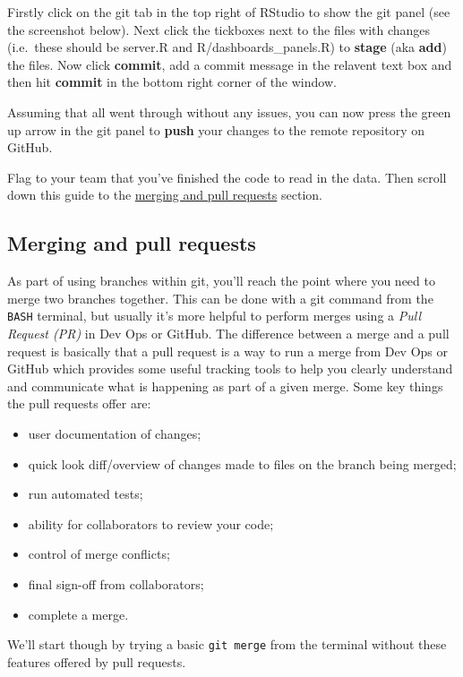 \documentclass[
  12pt,
]{article}
\providecommand{\tightlist}{%
  \setlength{\itemsep}{0pt}\setlength{\parskip}{0pt}}
\begin{document}
Firstly click on the git tab in the top right of RStudio to show the git
panel (see the screenshot below). Next click the tickboxes next to the
files with changes (i.e.~these should be server.R and
R/dashboards\_panels.R) to \textbf{stage} (aka \textbf{add}) the files.
Now click \textbf{commit}, add a commit message in the relavent text box
and then hit \textbf{commit} in the bottom right corner of the window.

Assuming that all went through without any issues, you can now press the
green up arrow in the git panel to \textbf{push} your changes to the
remote repository on GitHub.

Flag to your team that you've finished the code to read in the data.
Then scroll down this guide to the
\protect\hyperlink{merging-and-pull-requests}{merging and pull requests}
section.

\hypertarget{merging-and-pull-requests}{%
\subsection{Merging and pull requests}\label{merging-and-pull-requests}}

As part of using branches within git, you'll reach the point where you
need to merge two branches together. This can be done with a git command
from the \texttt{BASH} terminal, but usually it's more helpful to
perform merges using a \emph{Pull Request (PR)} in Dev Ops or GitHub.
The difference between a merge and a pull request is basically that a
pull request is a way to run a merge from Dev Ops or GitHub which
provides some useful tracking tools to help you clearly understand and
communicate what is happening as part of a given merge. Some key things
the pull requests offer are:

\begin{itemize}
\tightlist
\item
  user documentation of changes;
\item
  quick look diff/overview of changes made to files on the branch being
  merged;
\item
  run automated tests;
\item
  ability for collaborators to review your code;
\item
  control of merge conflicts;
\item
  final sign-off from collaborators;
\item
  complete a merge.
\end{itemize}

We'll start though by trying a basic \texttt{git\ merge} from the
terminal without these features offered by pull requests.
\end{document}
